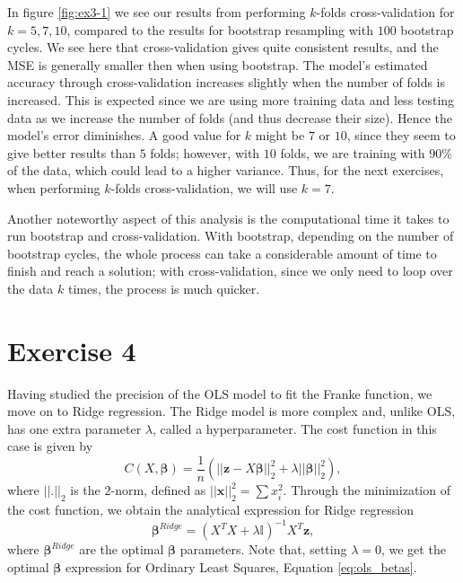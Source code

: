 \documentclass[10pt, a4paper]{article}
\begin{document}
    In figure \ref{fig:ex3-1} we see our results from performing $k$-folds cross-validation for \(k=5,7,10\), compared to the results for bootstrap resampling with $100$ bootstrap cycles. We see here that cross-validation gives quite consistent results, and the MSE is generally smaller then when using bootstrap. The model's estimated accuracy through cross-validation increases slightly when the number of folds is increased. This is expected since we are using more training data and less testing data as we increase the number of folds (and thus decrease their size). Hence the model's error diminishes. A good value for $k$ might be $7$ or $10$, since they seem to give better results than $5$ folds; however, with $10$ folds, we are training with $90\%$ of the data, which could lead to a higher variance. Thus, for the next exercises, when performing $k$-folds cross-validation, we will use $k=7$.
    
    Another noteworthy aspect of this analysis is the computational time it takes to run bootstrap and cross-validation. With bootstrap, depending on the number of bootstrap cycles, the whole process can take a considerable amount of time to finish and reach a solution; with cross-validation, since we only need to loop over the data $k$ times, the process is much quicker.
    
\section*{Exercise 4}

    Having studied the precision of the OLS model to fit the Franke function, we move on to Ridge regression. The Ridge model is more complex and, unlike OLS, has one extra parameter $\lambda$, called a hyperparameter. The cost function in this case is given by
    \begin{equation*}
        C(X, \bm{\beta}) = \frac{1}{n} \left(|| \bm{z} - X\bm{\beta} ||_2^2 + \lambda || \bm{\beta} ||_2^2\right),
    \end{equation*}
    where $||.||_2$ is the $2$-norm, defined as $||\bm{x}||_2^2=\sum x_i^2$. Through the minimization of the cost function, we obtain the analytical expression for Ridge regression
    \begin{equation} \label{eq:beta_ridge}
        \bm{\beta}^{Ridge} = \left(X^T X + \lambda \mathbb{I} \right)^{-1} X^T \bm{z},
    \end{equation}
    where $\bm{\beta}^{Ridge}$ are the optimal $\bm{\beta}$ parameters. Note that, setting $\lambda = 0$, we get the optimal $\bm{\beta}$ expression for Ordinary Least Squares, Equation \eqref{eq:ols_betas}.
    
\end{document}
